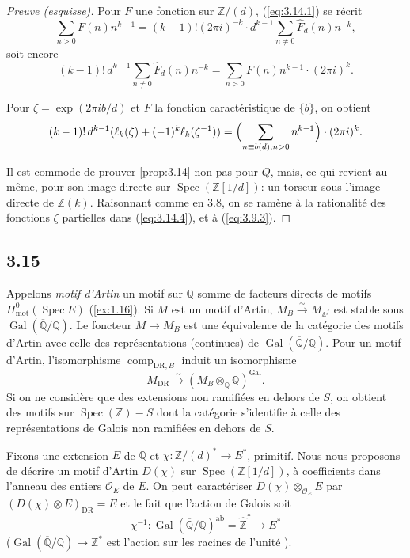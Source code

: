 \documentclass[12pt,a4paper]{article}
\theoremstyle{plain}
\theoremstyle{definition}
\theoremstyle{remark}
\DeclareMathOperator{\Spec}{Spec}
\DeclareMathOperator{\Gal}{Gal}
\newcommand{\mot}{\mathrm{mot}}
\providecommand{\Gal}{\operatorname{Gal}}
\providecommand{\Spec}{\operatorname{Spec}}
\providecommand{\mot}{\mathrm{mot}}
\providecommand{\DR}{\mathrm{DR}}
\providecommand{\comp}{\operatorname{comp}}
\providecommand{\ab}{\mathrm{ab}}
\begin{document}
\begin{proof}[Preuve (esquisse)]
Pour $F$ une fonction sur $\mathbb{Z}/(d)$, (\ref{eq:3.14.1}) se r\'ecrit
\begin{equation}\label{eq:3.14.2}
\sum_{n > 0} F(n) n^{k-1} = (k-1)! (2\pi i)^{-k} \cdot d^{k-1} \sum_{n \neq 0}
\hat{F}_d(n) n^{-k},
\end{equation}
soit encore
\begin{equation}\label{eq:3.14.3}
(k-1)!\, d^{k-1} \sum_{n \neq 0} \hat{F}_d(n) n^{-k} = \sum_{n > 0} F(n) n^{k-1}
\cdot (2\pi i)^k.
\end{equation}

Pour $\zeta = \exp(2\pi i b/d)$ et $F$ la fonction caract\'eristique de $\{b\}$, on
obtient
\begin{equation}\label{eq:3.14.4}
(k-1)!\, d^{k-1} (\ell_k(\zeta) + (-1)^k \ell_k(\zeta^{-1})) = \Bigl(\sum_{n \equiv
b(d), n > 0} n^{k-1}\Bigr) \cdot (2\pi i)^k.
\end{equation}

Il est commode de prouver \ref{prop:3.14} non pas pour $Q$, mais, ce qui revient au
m\^eme, pour son image directe sur $\Spec(\mathbb{Z}[1/d])$: un torseur sous l'image
directe de $\mathbb{Z}(k)$. Raisonnant comme en 3.8, on se ram\`ene \`a la rationalit\'e
des fonctions $\zeta$ partielles dans (\ref{eq:3.14.4}), et \`a (\ref{eq:3.9.3}).
\end{proof}

\subsection*{3.15}

Appelons \emph{motif d'Artin} un motif sur $\mathbb{Q}$ somme de facteurs directs de
motifs $H^0_\mot(\Spec E)$ (\ref{ex:1.16}). Si $M$ est un motif d'Artin, $M_B
\xrightarrow{\sim} M_{\mathbb{A}^f}$ est stable sous $\Gal(\overline{\mathbb{Q}}/\mathbb{Q})$.
Le foncteur $M \mapsto M_B$ est une \'equivalence de la cat\'egorie des motifs d'Artin
avec celle des repr\'esentations (continues) de $\Gal(\overline{\mathbb{Q}}/\mathbb{Q})$. Pour
un motif d'Artin, l'isomorphisme $\comp_{\DR,B}$ induit un isomorphisme
\[
M_{\DR} \xrightarrow{\sim} (M_B \otimes_{\mathbb{Q}} \overline{\mathbb{Q}})^{\Gal}.
\]
Si on ne consid\`ere que des extensions non ramifi\'ees en dehors de $S$, on obtient des
motifs sur $\Spec(\mathbb{Z}) - S$ dont la cat\'egorie s'identifie \`a celle des
repr\'esentations de Galois non ramifi\'ees en dehors de $S$.

Fixons une extension $E$ de $\mathbb{Q}$ et $\chi: \mathbb{Z}/(d)^* \to E^*$,
primitif. Nous nous proposons de d\'ecrire un motif d'Artin $D(\chi)$ sur
$\Spec(\mathbb{Z}[1/d])$, \`a coefficients dans l'anneau des entiers $\mathcal{O}_E$ de
$E$. On peut caract\'eriser $D(\chi) \otimes_{\mathcal{O}_E} E$ par $(D(\chi) \otimes E)_{\DR}
= E$ et le fait que l'action de Galois soit
\[
\chi^{-1}: \Gal(\overline{\mathbb{Q}}/\mathbb{Q})^{\ab} = \hat{\mathbb{Z}}^* \longrightarrow E^*
\]
($\Gal(\overline{\mathbb{Q}}/\mathbb{Q}) \to \mathbb{Z}^*$ est l'action sur les racines de
l'unit\'e ).
\end{document}
